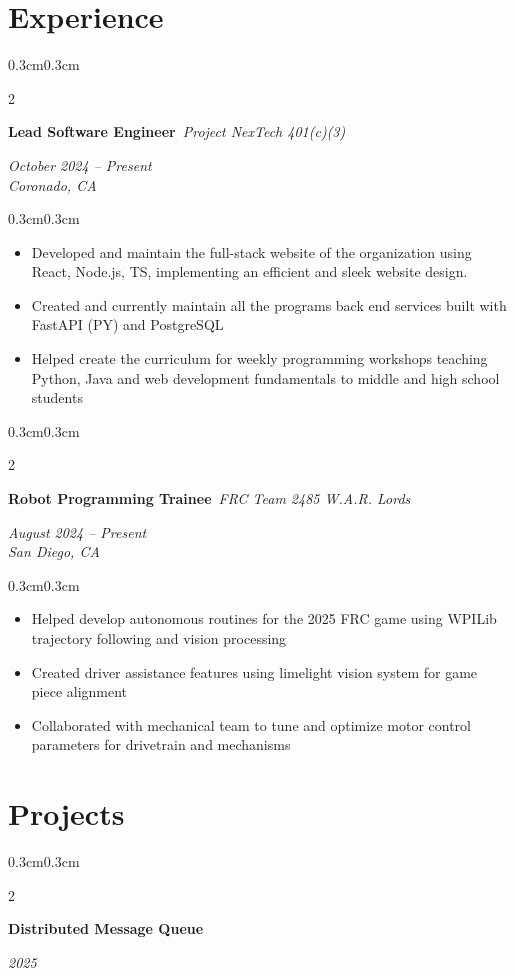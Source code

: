 \documentclass[11pt, letterpaper]{article}
\newenvironment{highlights}{
    \begin{itemize}[
        leftmargin=0.5cm,
        itemsep=0.2cm,
        parsep=0pt
    ]
}{
    \end{itemize}
}
\newenvironment{onecolentry}{
    \begin{adjustwidth}{0.3cm}{0.3cm}
}{
    \end{adjustwidth}
}
\newenvironment{twocolentry}[2][]{
    \onecolentry
    \def\secondColumn{#2}
    \setcolumnwidth{\fill, 5cm}
    \begin{paracol}{2}
}{
    \switchcolumn \raggedleft \color{dateColor}\secondColumn
    \end{paracol}
    \endonecolentry
}
\begin{document}
\section{Experience}

\begin{twocolentry}{\textit{October 2024 – Present}\\\textit{Coronado, CA}}
    \textbf{Lead Software Engineer}\
    \textit{Project NexTech 401(c)(3)}
\end{twocolentry}
\begin{onecolentry}
    \begin{highlights}
        \item Developed and maintain the full-stack website of the organization using React, Node.js, TS, implementing an efficient and sleek website design.
        \item Created and currently maintain all the programs back end services built with FastAPI (PY) and PostgreSQL
        \item Helped create the curriculum for weekly programming workshops teaching Python, Java and web development fundamentals to middle and high school students
    \end{highlights}
\end{onecolentry}

\begin{twocolentry}{\textit{August 2024 – Present}\\\textit{San Diego, CA}}
    \textbf{Robot Programming Trainee}\
    \textit{FRC Team 2485 W.A.R. Lords}
\end{twocolentry}
\begin{onecolentry}
    \begin{highlights}
        \item Helped develop autonomous routines for the 2025 FRC game using WPILib trajectory following and vision processing
        \item Created driver assistance features using limelight vision system for game piece alignment
        \item Collaborated with mechanical team to tune and optimize motor control parameters for drivetrain and mechanisms
    \end{highlights}
\end{onecolentry}

\section{Projects}
\begin{twocolentry}{\textit{2025}}
    \textbf{Distributed Message Queue}
\end{twocolentry}
\end{document}
